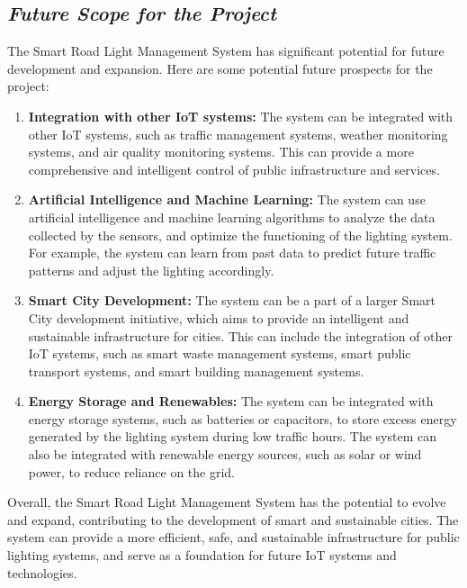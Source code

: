\documentclass{article}
\begin{document}
\subsection{\textit{Future Scope for the Project}}
The Smart Road Light Management System has significant potential for future development and expansion. Here are some potential future prospects for the project:
\begin{enumerate}
    \item \textbf{Integration with other IoT systems:} The system can be integrated with other IoT systems, such as traffic management systems, weather monitoring systems, and air quality monitoring systems. This can provide a more comprehensive and intelligent control of public infrastructure and services.
    \item \textbf{Artificial Intelligence and Machine Learning:} The system can use artificial intelligence and machine learning algorithms to analyze the data collected by the sensors, and optimize the functioning of the lighting system. For example, the system can learn from past data to predict future traffic patterns and adjust the lighting accordingly.
    \item \textbf{Smart City Development:} The system can be a part of a larger Smart City development initiative, which aims to provide an intelligent and sustainable infrastructure for cities. This can include the integration of other IoT systems, such as smart waste management systems, smart public transport systems, and smart building management systems.
    \item \textbf{Energy Storage and Renewables:} The system can be integrated with energy storage systems, such as batteries or capacitors, to store excess energy generated by the lighting system during low traffic hours. The system can also be integrated with renewable energy sources, such as solar or wind power, to reduce reliance on the grid.
\end{enumerate}
Overall, the Smart Road Light Management System has the potential to evolve and expand, contributing to the development of smart and sustainable cities. The system can provide a more efficient, safe, and sustainable infrastructure for public lighting systems, and serve as a foundation for future IoT systems and technologies.
\end{document}
